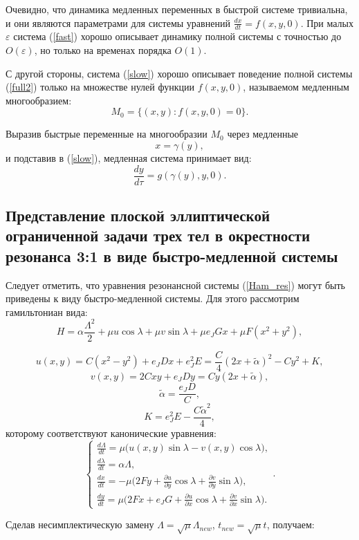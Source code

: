 Очевидно, что динамика медленных переменных в быстрой системе тривиальна, и они являются параметрами для системы уравнений $\frac{dx}{dt} = f(x,y,0)$. При малых $\varepsilon$ система (\ref{fast}) хорошо описывает динамику полной системы с точностью до $O(\varepsilon)$, но только на временах порядка $O(1)$.

С другой стороны, система (\ref{slow}) хорошо описывает поведение полной системы (\ref{full2}) только на множестве нулей функции $f(x,y,0)$, называемом медленным многообразием:
$$M_0 = \{ (x,y): f(x,y,0) = 0 \}.$$

Выразив быстрые переменные на многообразии $M_{0}$ через медленные
$$x = \gamma(y),$$
и подставив в (\ref{slow}), медленная система принимает вид:
$$\frac{dy}{d \tau} = g(\gamma(y), y, 0).$$
\subsection{Представление плоской эллиптической ограниченной задачи трех тел в окрестности резонанса 3:1 в виде быстро-медленной системы}

Следует отметить, что уравнения резонансной системы (\ref{Ham_res}) могут быть приведены к виду быстро-медленной системы. Для этого рассмотрим гамильтониан вида:
$$H = \alpha \frac{\Lambda^2}{2} + \mu u \cos \lambda + \mu v \sin \lambda + \mu e_J G x + \mu F(x^2+y^2),$$

$$u(x,y) = C(x^2-y^2)+e_J Dx +e_J^2E =\frac{C}{4}(2x+\tilde \alpha)^2-Cy^2+K,$$
$$v(x,y) = 2Cxy+e_JDy =Cy(2x+\tilde \alpha),$$
$$\tilde \alpha = \frac{e_JD}{C},$$
$$K = e_J^2 E-\frac{C \tilde \alpha^2}{4},$$
которому соответствуют канонические уравнения:
\begin{equation*}
    \begin{cases}
        \frac{d \Lambda}{dt} = \mu \big( u(x,y) \sin \lambda - v(x,y) \cos \lambda \big), \\
        \frac{d \lambda}{dt} = \alpha \Lambda, \\
        \frac{dx}{dt} = -\mu \big( 2Fy+\frac{\partial u}{\partial y} \cos \lambda + \frac{\partial v}{\partial y} \sin \lambda \big), \\
        \frac{dy}{dt} = \mu \big( 2Fx+e_JG +\frac{\partial u}{\partial x} \cos \lambda + \frac{\partial v}{\partial x} \sin \lambda \big).
    \end{cases}.
\end{equation*}

Сделав несимплектическую замену $\Lambda = \sqrt \mu \Lambda_{new}$, $t_{new} = \sqrt \mu t$, получаем:


